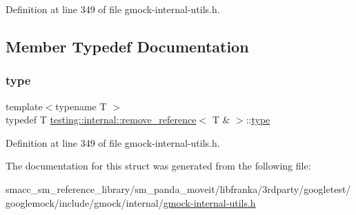 Definition at line 349 of file gmock-\/internal-\/utils.\+h.



\subsection{Member Typedef Documentation}
\mbox{\label{structtesting_1_1internal_1_1remove__reference_3_01T_01_6_01_4_a0d72f004f54016a47c752a82be352a19}} 
\subsubsection{\texorpdfstring{type}{type}}
{\footnotesize\ttfamily template$<$typename T $>$ \\
typedef T \hyperlink{structtesting_1_1internal_1_1remove__reference}{testing\+::internal\+::remove\+\_\+reference}$<$ T \& $>$\+::\hyperlink{structtesting_1_1internal_1_1remove__reference_3_01T_01_6_01_4_a0d72f004f54016a47c752a82be352a19}{type}}



Definition at line 349 of file gmock-\/internal-\/utils.\+h.



The documentation for this struct was generated from the following file\+:\begin{DoxyCompactItemize}
\item 
smacc\+\_\+sm\+\_\+reference\+\_\+library/sm\+\_\+panda\+\_\+moveit/libfranka/3rdparty/googletest/googlemock/include/gmock/internal/\hyperlink{gmock-internal-utils_8h}{gmock-\/internal-\/utils.\+h}\end{DoxyCompactItemize}
